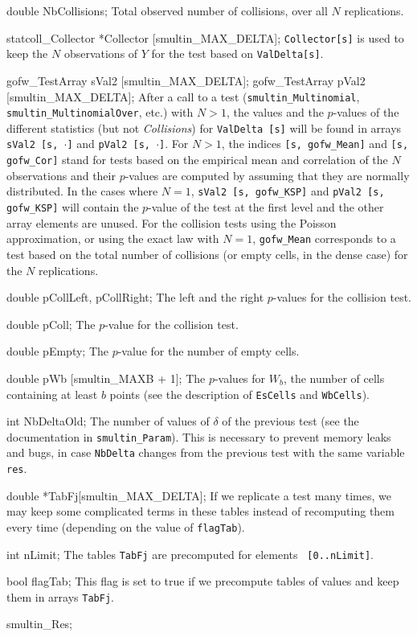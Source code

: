 {   double NbCollisions;
\endcode
\tabb
  Total observed number of collisions, over all $N$ replications.
 \endtabb
\code

   statcoll_Collector *Collector [smultin_MAX_DELTA];
\endcode
\tabb
  {\tt Collector[s]} is used to keep the $N$ observations of $Y$
  for the test based on {\tt ValDelta[s]}.
\endtabb
\code

   gofw_TestArray sVal2 [smultin_MAX_DELTA];
   gofw_TestArray pVal2 [smultin_MAX_DELTA];
\endcode
 \tabb
  After a call to a test ({\tt smultin\_Multinomial},
  {\tt smultin\_MultinomialOver}, etc.) with $N > 1$,
  the values and the $p$-values of the different statistics (but not
  {\em Collisions\/}) for {\tt ValDelta [s]} will be found in arrays
  {\tt sVal2 [s, $\cdot$]} and {\tt pVal2 [s, $\cdot$]}.
  For $N > 1$, the indices {\tt [s, gofw\_Mean]} and {\tt [s, gofw\_Cor]}
  stand for tests based on the empirical mean and correlation
  of the $N$ observations and their $p$-values are computed by assuming
  that they are normally distributed.
  In the cases where $N=1$, {\tt sVal2 [s, gofw\_KSP]} and
  {\tt pVal2 [s, gofw\_KSP]} will contain
  the $p$-value of the test at the first level  and the
  other array elements are unused.
  For the collision tests using the Poisson approximation,
  or using the exact law with $N = 1$,
  {\tt gofw\_Mean} corresponds to a  test based on the total number of
  collisions (or empty cells, in the dense case)
  for the $N$ replications.
 \endtabb
\code

   double pCollLeft, pCollRight;
\endcode
 \tabb The left and the right $p$-values for the collision test.
 \endtabb
\code

   double pColl;
\endcode
 \tabb The $p$-value for the collision test.
 \endtabb
\code

   double pEmpty;
\endcode
\tabb
  The $p$-value for the number of empty cells.
\endtabb
\code

   double pWb [smultin_MAXB + 1];
\endcode
 \tabb
 The  $p$-values for $W_b$, the number of cells containing at
  least $b$ points (see the description of {\tt EsCells} and
  {\tt  WbCells}).
 \endtabb
\fi  %
\hide  %
\code

   int NbDeltaOld;
\endcode
\tabb
   The number of values of $\delta$ of the previous test (see the
   documentation in {\tt smultin\_Param}). This is necessary to prevent
   memory leaks and bugs, in case {\tt NbDelta} changes from the previous
   test with the same variable {\tt res}.
\endtabb
\code

   double *TabFj[smultin_MAX_DELTA];
\endcode
\tabb If we replicate a test many times, we may keep some complicated
  terms in these tables instead of recomputing them every time
  (depending on the value of {\tt flagTab}).
\endtabb
\code

   int nLimit;
\endcode
\tabb  The tables {\tt TabFj} are precomputed for elements {\tt
  [0..nLimit]}.
\endtabb
\code

   bool flagTab;
\endcode
\tabb This flag is set to true if we precompute tables of values and keep
   them in arrays {\tt TabFj}.
\endtabb
\endhide  %
\ifdetailed  %
\code

} smultin_Res;


